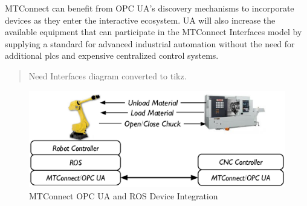 MTConnect can benefit from OPC UA's discovery mechanisms to incorporate devices as they enter the interactive ecosystem.  UA will also increase the available equipment that can participate in the MTConnect Interfaces model by supplying a standard for advanced industrial automation without the need for additional \glspl{plc} and expensive centralized control systems.

\begin{quote}
  \color{red}  Need Interfaces diagram converted to tikz.
\end{quote}

\begin{figure}
    \centering
    \includegraphics{diagrams/device-integration.eps}
    \caption{MTConnect OPC UA and ROS Device Integration}
    \label{fig:mtconnect-ros-opc}
\end{figure}

\FloatBarrier
